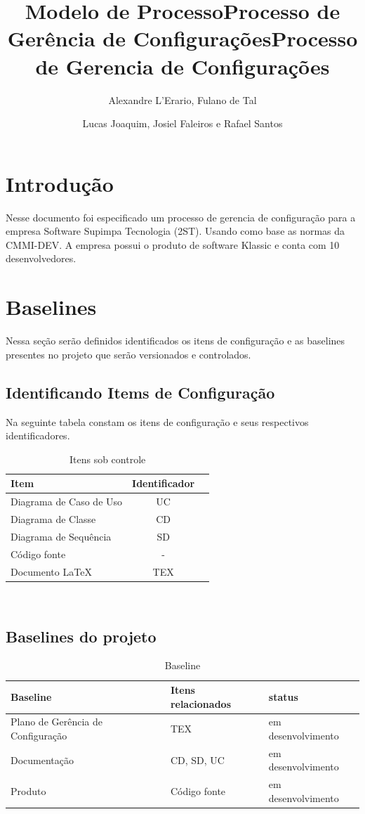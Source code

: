 \documentclass{article}
\title{Modelo de Processo}
\title{Processo de Gerência de Configurações}
\author{Alexandre L'Erario, Fulano de Tal }  	%
\date{}
\title{Processo de Gerencia de Configurações}
\author{Lucas Joaquim, Josiel Faleiros e Rafael Santos }
\begin{document}
	\maketitle
	\newpage
	\tableofcontents
	\newpage
	\section{Introdução}
    Nesse documento foi especificado um processo de gerencia de configuração para a empresa Software Supimpa Tecnologia (2ST). Usando como base as normas da CMMI-DEV. A empresa possui o produto de software Klassic e conta com 10 desenvolvedores.
    \section{Baselines}
	    Nessa seção serão definidos identificados os itens de configuração e as baselines presentes no projeto que serão versionados e controlados.
	    \subsection{Identificando Items de Configuração}
          Na seguinte tabela constam os itens de configuração e seus respectivos identificadores.
	  	\begin{table}[H]
			\begin{tabular}{l c r}
                  \textbf{Item} & \textbf{Identificador}\\
                  \hline
                  Diagrama de Caso de Uso & UC \\
                  Diagrama de Classe & CD \\
                  Diagrama de Sequência  & SD \\
                  Código fonte  & -\\
                  Documento LaTeX & TEX \\
              \end{tabular}\\
              \caption{Itens sob controle}
          \end{table}
          \subsection{Baselines do projeto}
          \begin{table}[H]
              \begin{tabular}{l l l}
                  \textbf{Baseline} & \textbf{Itens relacionados} & \textbf{status}\\
                  \hline
                  Plano de Gerência de Configuração & TEX & em desenvolvimento \\
                  Documentação & CD, SD, UC & em desenvolvimento \\
                  Produto & Código fonte & em desenvolvimento\\
              \end{tabular}\\
              \caption{Baseline}
          \end{table}
\end{document}
